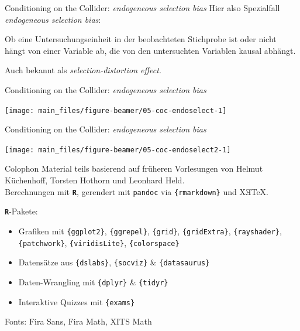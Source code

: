\documentclass[
  10pt,
  ignorenonframetext,
]{beamer}
\providecommand{\tightlist}{%
  \setlength{\itemsep}{0pt}\setlength{\parskip}{0pt}}
\begin{document}
\begin{frame}{Conditioning on the Collider: \emph{endogeneous selection
bias}}
\label{conditioning-on-the-collider-endogeneous-selection-bias}
Hier also Spezialfall \emph{endogeneous selection bias}:

Ob eine Untersuchungseinheit in der beobachteten Stichprobe ist oder
nicht hängt von einer Variable ab, die von den untersuchten Variablen
kausal abhängt.

Auch bekannt als \emph{selection-distortion effect}.
\end{frame}

\begin{frame}{Conditioning on the Collider: \emph{endogeneous selection
bias}}
\label{conditioning-on-the-collider-endogeneous-selection-bias-1}
\scriptsize

\begin{center}\texttt{[image: main\_files/figure-beamer/05-coc-endoselect-1]} \end{center}

\normalsize
\end{frame}

\begin{frame}{Conditioning on the Collider: \emph{endogeneous selection
bias}}
\label{conditioning-on-the-collider-endogeneous-selection-bias-2}
\scriptsize

\begin{center}\texttt{[image: main\_files/figure-beamer/05-coc-endoselect2-1]} \end{center}

\normalsize
\end{frame}

\begin{frame}[fragile]{Colophon}
\label{colophon}
Material teils basierend auf früheren Vorlesungen von Helmut Küchenhoff,
Torsten Hothorn und Leonhard Held.\\
Berechnungen mit \textbf{\texttt{R}}, gerendert mit \texttt{pandoc} via
\texttt{\{rmarkdown\}} und XƎTeX.

\textbf{\texttt{R}}-Pakete:

\begin{itemize}
\tightlist
\item
  Grafiken mit \texttt{\{ggplot2\}}, \texttt{\{ggrepel\}},
  \texttt{\{grid\}}, \texttt{\{gridExtra\}}, \texttt{\{rayshader\}},
  \texttt{\{patchwork\}}, \texttt{\{viridisLite\}},
  \texttt{\{colorspace\}}
\item
  Datensätze aus \texttt{\{dslabs\}}, \texttt{\{socviz\}} \&
  \texttt{\{datasaurus\}}
\item
  Daten-Wrangling mit \texttt{\{dplyr\}} \& \texttt{\{tidyr\}}
\item
  Interaktive Quizzes mit \texttt{\{exams\}}
\end{itemize}

Fonts: Fira Sans, Fira Math, XITS Math
\end{frame}
\end{document}
